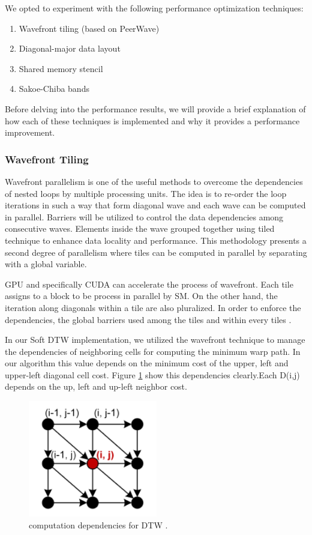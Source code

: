 \documentclass[12pt, letterpaper]{article}
\begin{document}
We opted to experiment with the following performance optimization techniques:

\begin{enumerate}
\item Wavefront tiling (based on PeerWave)
\item Diagonal-major data layout
\item Shared memory stencil
\item Sakoe-Chiba bands
\end{enumerate}

Before delving into the performance results, we will provide a brief explanation
of how each of these techniques is implemented and why it provides a performance
improvement.

\subsubsection{Wavefront Tiling}
Wavefront parallelism is one of the useful methods to overcome the dependencies
of nested loops by multiple processing units. The idea is to re-order the loop
iterations in such a way that form diagonal wave and each wave can be computed
in parallel. Barriers will be utilized to control the data dependencies among
consecutive waves. Elements inside the wave grouped together using tiled
technique to enhance data locality and performance. This methodology presents a
second degree of parallelism where tiles can be computed in parallel by
separating with a global variable.

GPU and specifically CUDA can accelerate the process of wavefront. Each tile
assigns to a block to be process in parallel by SM. On the other hand, the
iteration along diagonals within a tile are also pluralized. In order to enforce
the dependencies, the global barriers used among the tiles and within every
tiles \cite{belviranli_peerwave_2015}.

In our Soft DTW implementation, we utilized the wavefront technique to manage
the dependencies of neighboring cells for computing the minimum warp path. In
our algorithm this value depends on the minimum cost of the upper, left and
upper-left diagonal cell cost. Figure \ref{DTW_dependency} show this
dependencies clearly.Each D(i,j) depends on the up, left and up-left neighbor
cost.

\begin{figure}[htbp]
\includegraphics[height=2in]{img/tiling_dependencies.png}
\centering
\caption{computation dependencies for DTW \cite{belviranli_peerwave_2015}.}
\label{DTW_dependency}
\end{figure}
\end{document}
